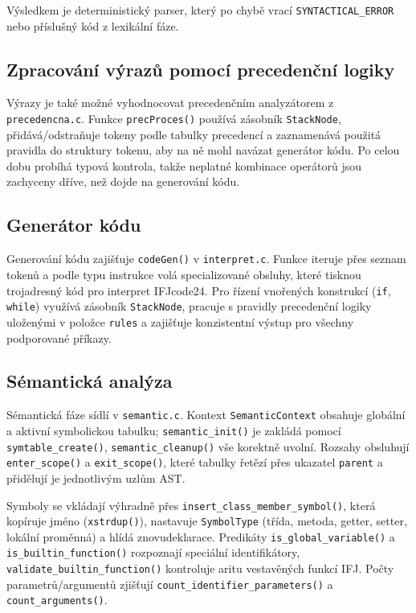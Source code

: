 \documentclass[a4paper,12pt]{article}
\begin{document}
Výsledkem je deterministický parser, který po chybě vrací \texttt{SYNTACTICAL\_ERROR} nebo příslušný kód z lexikální fáze.

\subsection{Zpracování výrazů pomocí precedenční logiky}
Výrazy je také možné vyhodnocovat precedenčním analyzátorem z \texttt{precedencna.c}. Funkce \texttt{precProces()} používá zásobník \texttt{StackNode}, přidává/odstraňuje tokeny podle tabulky precedencí a zaznamenává použitá pravidla do struktury tokenu, aby na ně mohl navázat generátor kódu. Po celou dobu probíhá typová kontrola, takže neplatné kombinace operátorů jsou zachyceny dříve, než dojde na generování kódu.

\subsection{Generátor kódu}
Generování kódu zajišťuje \texttt{codeGen()} v \texttt{interpret.c}. Funkce iteruje přes seznam tokenů a podle typu instrukce volá specializované obsluhy, které tisknou trojadresný kód pro interpret IFJcode24. Pro řízení vnořených konstrukcí (\texttt{if}, \texttt{while}) využívá zásobník \texttt{StackNode}, pracuje s pravidly precedenční logiky uloženými v položce \texttt{rules} a zajišťuje konzistentní výstup pro všechny podporované příkazy.

\subsection{Sémantická analýza}
Sémantická fáze sídlí v \texttt{semantic.c}. Kontext \texttt{SemanticContext} obsahuje globální a aktivní symbolickou tabulku; \texttt{semantic\_init()} je zakládá pomocí \texttt{symtable\_create()}, \texttt{semantic\_cleanup()} vše korektně uvolní. Rozsahy obsluhují \texttt{enter\_scope()} a \texttt{exit\_scope()}, které tabulky řetězí přes ukazatel \texttt{parent} a přidělují je jednotlivým uzlům AST.

Symboly se vkládají výhradně přes \texttt{insert\_class\_member\_symbol()}, která kopíruje jméno (\texttt{xstrdup()}), nastavuje \texttt{SymbolType} (třída, metoda, getter, setter, lokální proměnná) a hlídá znovudeklarace. Predikáty \texttt{is\_global\_variable()} a \texttt{is\_builtin\_function()} rozpoznají speciální identifikátory, \texttt{validate\_builtin\_function()} kontroluje aritu vestavěných funkcí IFJ. Počty parametrů/argumentů zjišťují \texttt{count\_identifier\_parameters()} a \texttt{count\_arguments()}.
\end{document}
